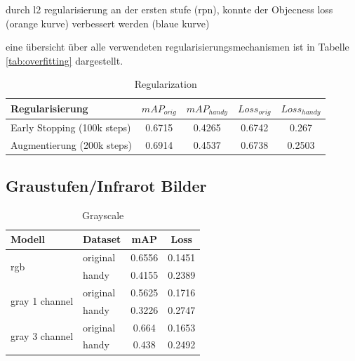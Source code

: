 durch l2 regularisierung an der ersten stufe (rpn), konnte 
der Objecness loss (orange kurve) verbessert werden (blaue kurve)



\begin{minipage}[t]{0.5\textwidth}
    \centering
    \label{fig:speed_acc}
    \def\svgwidth{0.9\textwidth}
    
\end{minipage}
\begin{minipage}[t]{0.5\textwidth}
    \centering
    \label{fig:speed_acc}
    \def\svgwidth{0.9\textwidth}
    
\end{minipage}


eine übersicht über alle verwendeten regularisierungsmechanismen ist in 
Tabelle \ref{tab:overfitting} dargestellt.





\begin{table}[htb]
    \centering
    \label{tab:regularization}
    \begin{tabular}{| l || c | c | c | c |} 
        \hline
        Regularisierung & $mAP_{orig}$ & $mAP_{handy}$ & $Loss_{orig}$ &  $Loss_{handy}$\\
        \hline
        Early Stopping (100k steps) & 0.6715 & 0.4265 & 0.6742 & 0.267\\
        \hline
        Augmentierung (200k steps) & 0.6914 & 0.4537 & 0.6738 & 0.2503\\ %
        \hline
    \end{tabular}        
    \caption{Regularization}
\end{table}





\subsection{Graustufen/Infrarot Bilder}\label{subsec:eval_gray}


\begin{table}[htb]
    \centering
    \label{tab:eval_gray}
    \begin{tabular}{| l | l || c | c |} 
        \hline
        Modell & Dataset & mAP & Loss\\
        \hline
        \multirow{2}{*}{rgb} & original & 0.6556 & 0.1451 \\
        & handy & 0.4155 & 0.2389 \\
        \hline
        \multirow{2}{*}{gray 1 channel} & original & 0.5625 & 0.1716 \\
        & handy & 0.3226 & 0.2747 \\
        \hline
        \multirow{2}{*}{gray 3 channel} & original & 0.664 & 0.1653 \\
        & handy & 0.438 & 0.2492 \\
        \hline
    \end{tabular}        
    \caption{Grayscale}
\end{table}


